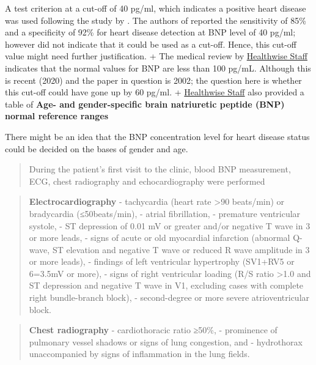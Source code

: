 \documentclass[11pt]{article}
\begin{document}
A test criterion at a cut-off of 40 pg/ml, which indicates a positive
heart disease was used following the study by \cite{4980048/2GX3J5M9}.
The authors of \cite{4980048/2GX3J5M9} reported the sensitivity of 85\%
and a specificity of 92\% for heart disease detection at BNP level of 40
pg/ml; however did not indicate that it could be used as a cut-off.
Hence, this cut-off value might need further justification. + The
medical review by
\href{https://www.cham.org/HealthwiseArticle.aspx?id=ux1072\#ux1079}{Healthwise
Staff} indicates that the normal values for BNP are less than 100 pg/mL.
Although this is recent (2020) and the paper in question is 2002; the
question here is whether this cut-off could have gone up by 60 pg/ml. +
\href{https://www.cham.org/HealthwiseArticle.aspx?id=ux1072\#ux1079}{Healthwise
Staff} also provided a table of \textbf{Age- and gender-specific brain
natriuretic peptide (BNP) normal reference ranges}

There might be an idea that the BNP concentration level for heart
disease status could be decided on the bases of gender and age.

\begin{quote}
During the patient's first visit to the clinic, blood BNP measurement,
ECG, chest radiography and echocardiography were performed
\end{quote}

\begin{quote}
\textbf{Electrocardiography} - tachycardia (heart rate \textgreater90
beats/min) or bradycardia (≤50beats/min), - atrial fibrillation, -
premature ventricular systole, - ST depression of 0.01 mV or greater
and/or negative T wave in 3 or more leads, - signs of acute or old
myocardial infarction (abnormal Q-wave, ST elevation and negative T wave
or reduced R wave amplitude in 3 or more leads), - findings of left
ventricular hypertrophy (SV1+RV5 or 6=3.5mV or more), - signs of right
ventricular loading (R/S ratio \textgreater1.0 and ST depression and
negative T wave in V1, excluding cases with complete right bundle-branch
block), - second-degree or more severe atrioventricular block.
\end{quote}

\begin{quote}
\textbf{Chest radiography} - cardiothoracic ratio ≥50\%, - prominence of
pulmonary vessel shadows or signs of lung congestion, and - hydrothorax
unaccompanied by signs of inflammation in the lung fields.
\end{quote}
\end{document}
